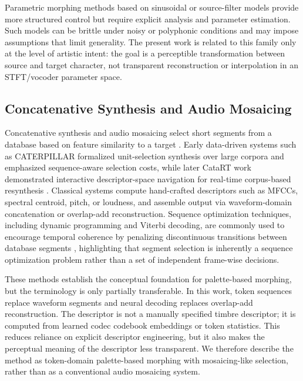 \documentclass[twoside,a4paper]{article}
\begin{document}
Parametric morphing methods based on sinusoidal or source-filter models provide more structured control but require explicit analysis and parameter estimation. Such models can be brittle under noisy or polyphonic conditions and may impose assumptions that limit generality. The present work is related to this family only at the level of artistic intent: the goal is a perceptible transformation between source and target character, not transparent reconstruction or interpolation in an STFT/vocoder parameter space.

\subsection{Concatenative Synthesis and Audio Mosaicing}

Concatenative synthesis and audio mosaicing select short segments from a database based on feature similarity to a target \cite{Schwarz:2000:DataDrivenConcatenative,Schwarz:2003:CATERPILLAR,Zils:2001:MusicalMosaicing,Schwarz:2006:CataRT,Schwarz:2006:Concatenative,Driedger:2015:LetItBee}. Early data-driven systems such as CATERPILLAR formalized unit-selection synthesis over large corpora and emphasized sequence-aware selection costs, while later CataRT work demonstrated interactive descriptor-space navigation for real-time corpus-based resynthesis \cite{Schwarz:2003:CATERPILLAR,Schwarz:2006:CataRT,Schwarz:2004:PhD}. Classical systems compute hand-crafted descriptors such as MFCCs, spectral centroid, pitch, or loudness, and assemble output via waveform-domain concatenation or overlap-add reconstruction. Sequence optimization techniques, including dynamic programming and Viterbi decoding, are commonly used to encourage temporal coherence by penalizing discontinuous transitions between database segments \cite{Schwarz:2004:PhD,Schwarz:2006:CorpusBased}, highlighting that segment selection is inherently a sequence optimization problem rather than a set of independent frame-wise decisions.

These methods establish the conceptual foundation for palette-based morphing, but the terminology is only partially transferable. In this work, token sequences replace waveform segments and neural decoding replaces overlap-add reconstruction. The descriptor is not a manually specified timbre descriptor; it is computed from learned codec codebook embeddings or token statistics. This reduces reliance on explicit descriptor engineering, but it also makes the perceptual meaning of the descriptor less transparent. We therefore describe the method as token-domain palette-based morphing with mosaicing-like selection, rather than as a conventional audio mosaicing system.
\end{document}
